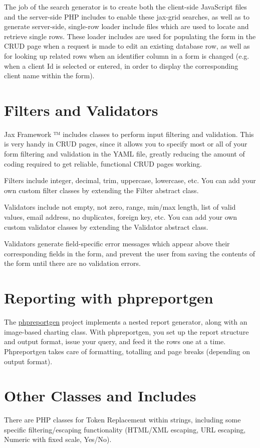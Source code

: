 \documentclass[letterpaper,10pt,english]{sphinxmanual}
\begin{document}
The job of the search generator is to create both the client-side JavaScript files and the
server-side PHP includes to enable these jax-grid searches, as well as to generate
server-side, single-row loader include files which are used to locate and retrieve single rows.
These loader includes are used for populating the form in the CRUD page when a request is made to
edit an existing database row, as well as for looking up related rows when an identifier column in a
form is changed (e.g. when a client Id is selected or entered, in order to display the corresponding
client name within the form).


\section{Filters and Validators}
\label{jaxFrameworkGuide:filters-and-validators}
Jax Framework ™ includes classes to perform input filtering and validation.  This is very
handy in CRUD pages, since it allows you to specify most or all of your form filtering and
validation in the YAML file, greatly reducing the amount of coding required to get reliable,
functional CRUD pages working.

Filters include integer, decimal, trim, uppercase, lowercase, etc.  You can add your own custom
filter classes by extending the Filter abstract class.

Validators include not empty, not zero, range, min/max length, list of valid values, email address,
no duplicates, foreign key, etc.  You can add your own custom validator classes by extending the
Validator abstract class.

Validators generate field-specific error messages which appear above their corresponding fields in
the form, and prevent the user from saving the contents of the form until there are no validation
errors.


\section{Reporting with phpreportgen}
\label{jaxFrameworkGuide:reporting-with-phpreportgen}
The \href{http://phpreportgen.sourceforge.net/}{phpreportgen} project implements a nested report
generator, along with an image-based charting class.  With phpreportgen, you set up the report
structure and output format, issue your query, and feed it the rows one at a time.  Phpreportgen
takes care of formatting, totalling and page breaks (depending on output format).


\section{Other Classes and Includes}
\label{jaxFrameworkGuide:other-classes-and-includes}
There are PHP classes for Token Replacement within strings, including some specific
filtering/escaping functionality (HTML/XML escaping, URL escaping, Numeric with fixed scale,
Yes/No).
\end{document}
